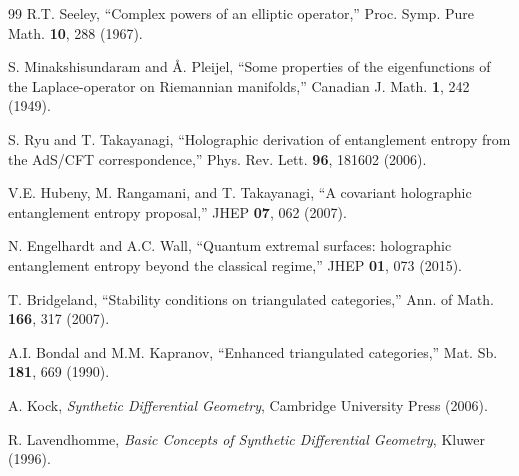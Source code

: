 \documentclass[12pt,a4paper]{article}
\begin{document}
\begin{thebibliography}{99}
R.T. Seeley, ``Complex powers of an elliptic operator,'' Proc. Symp. Pure Math. \textbf{10}, 288 (1967).

S. Minakshisundaram and Å. Pleijel, ``Some properties of the eigenfunctions of the Laplace-operator on Riemannian manifolds,'' Canadian J. Math. \textbf{1}, 242 (1949).

S. Ryu and T. Takayanagi, ``Holographic derivation of entanglement entropy from the AdS/CFT correspondence,'' Phys. Rev. Lett. \textbf{96}, 181602 (2006).

V.E. Hubeny, M. Rangamani, and T. Takayanagi, ``A covariant holographic entanglement entropy proposal,'' JHEP \textbf{07}, 062 (2007).

N. Engelhardt and A.C. Wall, ``Quantum extremal surfaces: holographic entanglement entropy beyond the classical regime,'' JHEP \textbf{01}, 073 (2015).

T. Bridgeland, ``Stability conditions on triangulated categories,'' Ann. of Math. \textbf{166}, 317 (2007).

A.I. Bondal and M.M. Kapranov, ``Enhanced triangulated categories,'' Mat. Sb. \textbf{181}, 669 (1990).

A. Kock, \textit{Synthetic Differential Geometry}, Cambridge University Press (2006).

R. Lavendhomme, \textit{Basic Concepts of Synthetic Differential Geometry}, Kluwer (1996).

\end{thebibliography}
\end{document}

